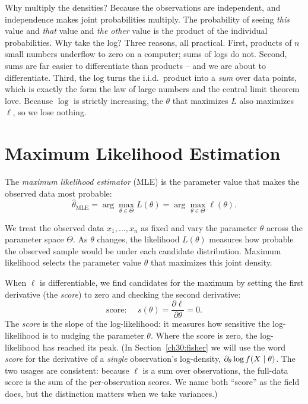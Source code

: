 \begin{whybox}
Why multiply the densities? Because the observations are independent, and
independence makes joint probabilities multiply. The probability of seeing
\emph{this} value and \emph{that} value and \emph{the other} value is the
product of the individual probabilities. Why take the log? Three reasons, all
practical. First, products of $n$ small numbers underflow to zero on a computer;
sums of logs do not. Second, sums are far easier to differentiate than products
-- and we are about to differentiate. Third, the log turns the i.i.d.\ product
into a \emph{sum} over data points, which is exactly the form the law of large
numbers and the central limit theorem love. Because $\log$ is strictly
increasing, the $\theta$ that maximizes $L$ also maximizes $\ell$, so we lose
nothing.
\end{whybox}

\section{Maximum Likelihood Estimation}
\label{ch30:mle}

\begin{definition}
\label{ch30:def-mle}
The \emph{maximum likelihood estimator} (MLE) is the parameter value that makes
the observed data most probable:
\[
  \hat\theta_{\mathrm{MLE}} = \arg\max_{\theta \in \Theta} L(\theta)
                            = \arg\max_{\theta \in \Theta} \ell(\theta).
\]
\end{definition}

We treat the observed data $x_1, \dots, x_n$ as fixed and vary the parameter $\theta$ across the parameter space $\Theta$. As $\theta$ changes, the likelihood $L(\theta)$ measures how probable the observed sample would be under each candidate distribution. Maximum likelihood selects the parameter value $\hat\theta$ that maximizes this joint density.

When $\ell$ is differentiable, we find candidates for the maximum by setting the first derivative (the \emph{score}) to zero and checking the second derivative:
\[
  \text{score: } \quad s(\theta) = \frac{\partial \ell}{\partial \theta} = 0.
\]
The \emph{score} is the slope of the log-likelihood: it measures how sensitive
the log-likelihood is to nudging the parameter $\theta$. Where the score is zero,
the log-likelihood has reached its peak. (In Section~\ref{ch30:fisher} we
will use the word \emph{score} for the derivative of a \emph{single}
observation's log-density, $\partial_\theta\log f(X\mid\theta)$. The two
usages are consistent: because $\ell$ is a sum over observations, the full-data
score is the sum of the per-observation scores. We name both ``score'' as the
field does, but the distinction matters when we take variances.)


